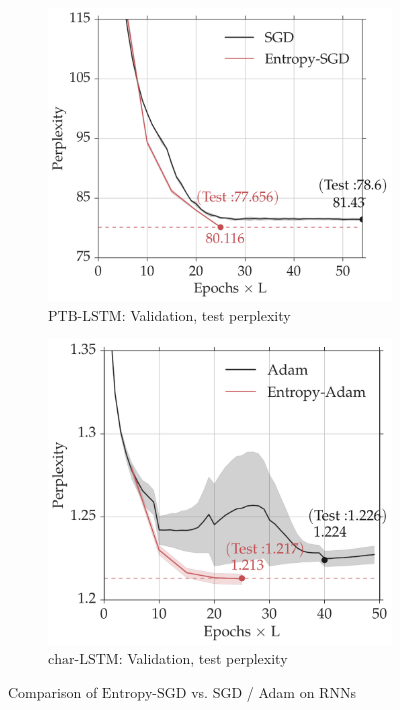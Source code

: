 \documentclass[10pt]{article}
\newcommand{\entropysgd}{\mathrm{Entropy}\textrm{-}\mathrm{SGD}}
\newcommand{\charlstm}{\textrm{char-LSTM}}
\newcommand{\ptblstm}{\textrm{PTB-LSTM}}
\begin{document}
\begin{figure}[htp!]
\centering
    \begin{subfigure}[b]{0.45\textwidth}
        \centering
        \includegraphics[width=1.03\textwidth]{ptblstm_valid.pdf}
        \caption{\small $\ptblstm$: Validation, test perplexity}
        \label{fig:ptb_valid}
    \end{subfigure}
    \hspace{0.2in}
    \begin{subfigure}[b]{0.45\textwidth}
        \centering
        \includegraphics[width=\textwidth]{charlstm_valid.pdf}
        \caption{\small $\charlstm$: Validation, test perplexity}
        \label{fig:char_valid}
    \end{subfigure}
\caption{\small Comparison of $\entropysgd$ vs. SGD / Adam on RNNs}
\label{fig:rnn}
\end{figure}
\end{document}
